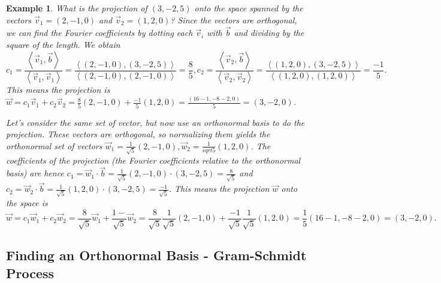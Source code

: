 \documentclass[10pt]{article}
\theoremstyle{plain}
\theoremstyle{box}
\newtheorem{example}{Example}
\begin{document}
\begin{example}
What is the projection of $(3,-2,5)$ onto the space spanned by the vectors $\vec v_1=(2,-1,0)$ and $\vec v_2 = (1,2,0)$? Since the vectors are orthogonal, we can find the Fourier coefficients by dotting each $\vec v_i$ with $\vec b$ and dividing by the square of the length.  We obtain 
$$c_1 =  \frac{\left<\vec v_1, \vec b\right>}{\left<\vec v_1, \vec v_1\right>}
= \frac{\left<(2,-1,0), (3,-2,5)\right>}{\left<(2,-1,0), (2,-1,0)\right>} =  \frac{8}{5},
 c_2 =  \frac{\left<\vec v_2, \vec b\right>}{\left<\vec v_2, \vec v_2\right>}
= \frac{\left<(1,2,0), (3,-2,5)\right>}{\left<(1,2,0), (1,2,0)\right>} =  \frac{-1}{5}.$$
This means the projection is $\vec w = c_1\vec v_1+c_2\vec v_2 = \frac{8}{5}(2,-1,0) + \frac{-1}{5}(1,2,0) = \frac{(16-1,-8-2,0)}{5} = (3,-2,0)$.

Let's consider the same set of vector, but now use an orthonormal basis to do the projection. These vectors are orthogonal, so normalizing them yields the orthonormal set of vectors $\vec w_1 = \frac{1}{\sqrt{5}}(2,-1,0), \vec w_2=\frac{1}{sqrt{5}}(1,2,0)$.  The coefficients of the projection (the Fourier coefficients relative to the orthonormal basis) are hence $c_1 = \vec w_1\cdot \vec b = \frac{1}{\sqrt{5}}(2,-1,0)\cdot (3,-2,5) = \frac{8}{\sqrt{5}}$ and $c_2 =  \vec w_2\cdot \vec b = \frac{1}{\sqrt{5}}(1,2,0)\cdot (3,-2,5) = \frac{-1}{\sqrt{5}}$.  This means the projection $\vec w$ onto the space is 
$$\vec w = c_1 \vec w_1 + c_2\vec w_2 
= \frac{8}{\sqrt{5}} \vec w_1 + \frac{1-}{\sqrt{5}}\vec w_2 
= \frac{8}{\sqrt{5}} \frac{1}{\sqrt{5}}(2,-1,0) + \frac{-1}{\sqrt{5}}\frac{1}{\sqrt{5}}(1,2,0) 
= \frac{1}{5}(16-1,-8-2,0) = (3,-2,0).
$$
\end{example}

\subsection{Finding an Orthonormal Basis - Gram-Schmidt Process}
\end{document}
